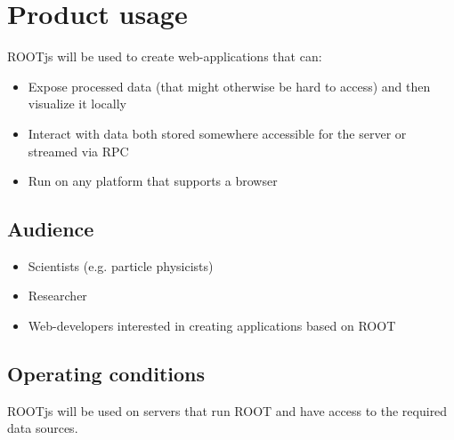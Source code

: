 \chapter{Product usage}

ROOTjs will be used to create web-applications that can:
\begin{itemize}
	\item Expose processed data (that might otherwise be hard to access) and then visualize it locally
	\item Interact with data both stored somewhere accessible for the server or streamed via RPC
	\item Run on any platform that supports a browser
\end{itemize}


\section{Audience}
\begin{itemize}
	\item Scientists (e.g. particle physicists)
	\item Researcher
	\item Web-developers interested in creating applications based on ROOT
\end{itemize}

\section{Operating conditions}

ROOTjs will be used on servers that run ROOT and have access to the required data sources.
